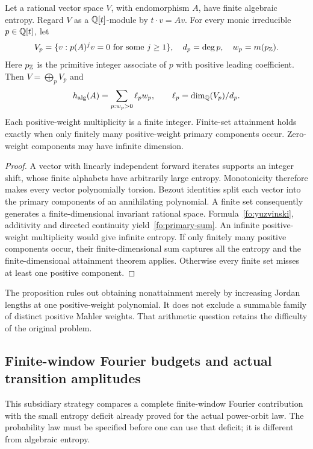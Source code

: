 \begin{proposition}\label{fo:primary}
Let a rational vector space $V$, with endomorphism $A$, have finite algebraic entropy.
Regard $V$ as a $\mathbb Q[t]$-module by $t\cdot v=Av$.
For every monic irreducible $p\in\mathbb Q[t]$, let
\[
 V_p=\{v:p(A)^jv=0\text{ for some }j\ge1\},\quad
 d_p=\deg p,\quad w_p=m(p_{\mathbb Z}).
\]
Here $p_{\mathbb Z}$ is the primitive integer associate of $p$ with positive leading coefficient.
Then $V=\bigoplus_pV_p$ and
\begin{equation}\label{fo:primary-sum}
 h_{\rm alg}(A)=\sum_{p:w_p>0}\ell_pw_p,
 \qquad \ell_p=\dim_{\mathbb Q}(V_p)/d_p.
\end{equation}
Each positive-weight multiplicity is a finite integer.
Finite-set attainment holds exactly when only finitely many positive-weight primary components occur.
Zero-weight components may have infinite dimension.
\end{proposition}
\begin{proof}
A vector with linearly independent forward iterates supports an integer shift, whose finite alphabets have arbitrarily large entropy.
Monotonicity therefore makes every vector polynomially torsion.
Bezout identities split each vector into the primary components of an annihilating polynomial.
A finite set consequently generates a finite-dimensional invariant rational space.
Formula~\eqref{fo:yuzvinski}, additivity and directed continuity yield~\eqref{fo:primary-sum}.
An infinite positive-weight multiplicity would give infinite entropy.
If only finitely many positive components occur, their finite-dimensional sum captures all the entropy and the finite-dimensional attainment theorem applies.
Otherwise every finite set misses at least one positive component.
\end{proof}

The proposition rules out obtaining nonattainment merely by increasing Jordan lengths at one positive-weight polynomial.
It does not exclude a summable family of distinct positive Mahler weights.
That arithmetic question retains the difficulty of the original problem.


\subsection{Finite-window Fourier budgets and actual transition amplitudes}
\label{sec:fourier}

This subsidiary strategy compares a complete finite-window Fourier contribution with the small entropy deficit already proved for the actual power-orbit law.
The probability law must be specified before one can use that deficit; it is different from algebraic entropy.

